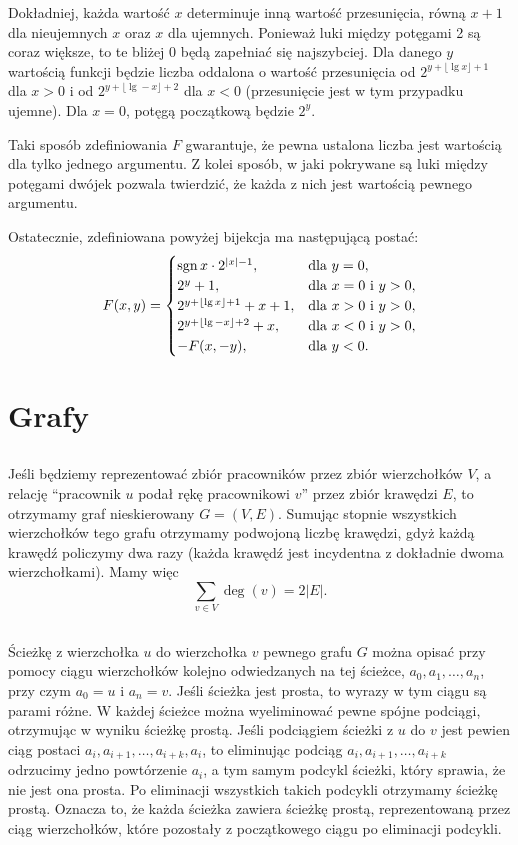 Dokładniej, każda wartość $x$ determinuje inną wartość przesunięcia, równą $x+1$ dla nieujemnych $x$ oraz $x$ dla ujemnych. Ponieważ luki między potęgami 2 są coraz większe, to te bliżej 0 będą zapełniać się najszybciej. Dla danego $y$ wartością funkcji będzie liczba oddalona o wartość przesunięcia od $2^{y+\lfloor\lg x\rfloor+1}$ dla $x>0$ i od $2^{y+\lfloor\lg-x\rfloor+2}$ dla $x<0$ (przesunięcie jest w tym przypadku ujemne). Dla $x=0$, potęgą początkową będzie $2^y$.

Taki sposób zdefiniowania $F$ gwarantuje, że pewna ustalona liczba jest wartością dla tylko jednego argumentu. Z kolei sposób, w jaki pokrywane są luki między potęgami dwójek pozwala twierdzić, że każda z nich jest wartością pewnego argumentu.

Ostatecznie, zdefiniowana powyżej bijekcja ma następującą postać:
\[
	F(x,y) =
	\begin{cases}
		\mathrm{sgn}\,x\cdot2^{|x|-1}, & \hbox{dla }y=0, \\
		2^y+1, & \hbox{dla }x=0\hbox{ i }y>0, \\
		2^{y+\lfloor\lg x\rfloor+1}+x+1, & \hbox{dla }x>0\hbox{ i }y>0, \\
		2^{y+\lfloor\lg-x\rfloor+2}+x, & \hbox{dla }x<0\hbox{ i }y>0, \\
		-F(x,-y), & \hbox{dla }y<0.
	\end{cases}
\]

\section{Grafy}

\subsection{} %
Jeśli będziemy reprezentować zbiór pracowników przez zbiór wierzchołków $V$, a relację ``pracownik $u$ podał rękę pracownikowi $v$'' przez zbiór krawędzi $E$, to otrzymamy graf nieskierowany $G=(V,E)$. Sumując stopnie wszystkich wierzchołków tego grafu otrzymamy podwojoną liczbę krawędzi, gdyż każdą krawędź policzymy dwa razy (każda krawędź jest incydentna z dokładnie dwoma wierzchołkami). Mamy więc
\[
	\sum_{v\in V}\deg(v)=2|E|.
\]

\subsection{} %
Ścieżkę z wierzchołka $u$ do wierzchołka $v$ pewnego grafu $G$ można opisać przy pomocy ciągu wierzchołków kolejno odwiedzanych na tej ścieżce, $a_0,a_1,\dots,a_n$, przy czym $a_0=u$ i $a_n=v$. Jeśli ścieżka jest prosta, to wyrazy w tym ciągu są parami różne. W każdej ścieżce można wyeliminować pewne spójne podciągi, otrzymując w wyniku ścieżkę prostą. Jeśli podciągiem ścieżki z $u$ do $v$ jest pewien ciąg postaci $a_i,a_{i+1},\dots,a_{i+k},a_i$, to eliminując podciąg $a_i,a_{i+1},\dots,a_{i+k}$ odrzucimy jedno powtórzenie $a_i$, a tym samym podcykl ścieżki, który sprawia, że nie jest ona prosta. Po eliminacji wszystkich takich podcykli otrzymamy ścieżkę prostą. Oznacza to, że każda ścieżka zawiera ścieżkę prostą, reprezentowaną przez ciąg wierzchołków, które pozostały z początkowego ciągu po eliminacji podcykli.

